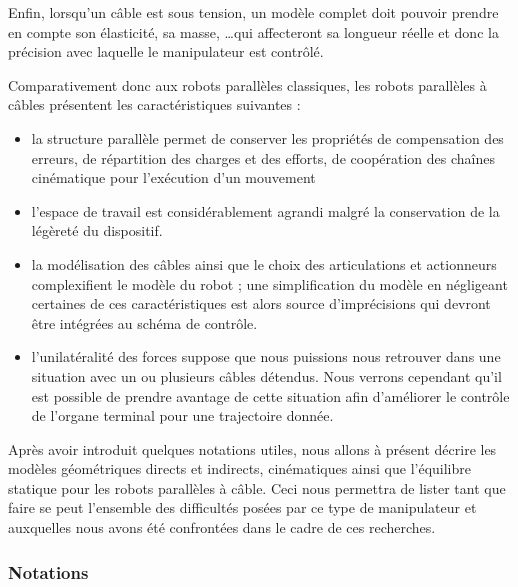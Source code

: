 Enfin, lorsqu'un câble est sous tension, un modèle complet doit pouvoir prendre en compte son élasticité, sa masse, \dots qui affecteront sa longueur réelle et donc la précision avec laquelle le manipulateur est contrôlé.

Comparativement donc aux robots parallèles classiques, les robots parallèles à câbles présentent les caractéristiques suivantes :
\begin{itemize}
 \item la structure parallèle permet de conserver les propriétés de compensation des erreurs, de répartition des charges et des efforts, de coopération des chaînes cinématique pour l'exécution d'un mouvement
 \item l'espace de travail est considérablement agrandi malgré la conservation de la légèreté du dispositif.
 \item la modélisation des câbles ainsi que le choix des articulations et actionneurs complexifient le modèle du robot ; une simplification du modèle en négligeant certaines de ces caractéristiques est alors source d'imprécisions qui devront être intégrées au schéma de contrôle.
 \item l'unilatéralité des forces suppose que nous puissions nous retrouver dans une situation avec un ou plusieurs câbles détendus. Nous verrons cependant qu'il est possible de prendre avantage de cette situation afin d'amélio\-rer le contrôle de l'organe terminal pour une trajectoire donnée.
\end{itemize}

Après avoir introduit quelques notations utiles, nous allons à présent décrire les modèles géométriques directs et indirects, cinématiques ainsi que l'équilibre statique pour les robots parallèles à câble. Ceci nous permettra de lister tant que faire se peut l'ensemble des difficultés posées par ce type de manipulateur et auxquelles nous avons été confrontées dans le cadre de ces recherches.

\subsubsection{Notations}

